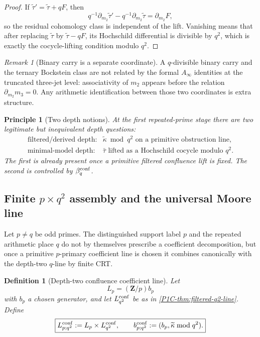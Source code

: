 \documentclass[11pt]{article}
\newtheorem{definition}[theorem]{Definition}
\newtheorem{principle}[theorem]{Principle}
\theoremstyle{remark}
\newtheorem{remark}[theorem]{Remark}
\newcommand{\Z}{\mathbf Z}
\begin{document}
\begin{proof}
If $\widetilde\tau'=\widetilde\tau+qF$, then
\[
 q^{-1}\partial_{m_2}\widetilde\tau'
 -q^{-1}\partial_{m_2}\widetilde\tau
 =\partial_{m_2}F,
\]
so the residual cohomology class is independent of the lift.  Vanishing means that after replacing $\widetilde\tau$ by $\widetilde\tau-qF$, its Hochschild differential is divisible by $q^2$, which is exactly the cocycle-lifting condition modulo $q^2$.
\end{proof}

\begin{remark}[Binary carry is a separate coordinate]
A $q$-divisible binary carry and the ternary Bockstein class are not related by the formal $A_\infty$ identities at the truncated three-jet level: associativity of $m_2$ appears before the relation $\partial_{m_2}m_3=0$.  Any arithmetic identification between those two coordinates is extra structure.
\end{remark}

\begin{principle}[Two depth notions]\label{P1C-prin:two-depth-notions}
At the first repeated-prime stage there are two legitimate but inequivalent depth questions:
\[
 \boxed{
 \begin{array}{ll}
 \text{filtered/derived depth:}
   & \widetilde\kappa\bmod q^2\text{ on a primitive obstruction line},\\[1mm]
 \text{minimal-model depth:}
   & \bar\tau\text{ lifted as a Hochschild cocycle modulo }q^2.
 \end{array}}
\]
The first is already present once a primitive filtered confluence lift is fixed.  The second is controlled by $\beta_q^{\rm conf}$.
\end{principle}

\subsection{Finite $p\times q^2$ assembly and the universal Moore line}

Let $p\ne q$ be odd primes.  The distinguished support label $p$ and the repeated arithmetic place $q$ do not by themselves prescribe a coefficient decomposition, but once a primitive $p$-primary coefficient line is chosen it combines canonically with the depth-two $q$-line by finite CRT.

\begin{definition}[Depth-two confluence coefficient line]\label{P1C-def:pq2-confluence-line}
Let
\[
 L_p=(\Z/p)b_p
\]
with $b_p$ a chosen generator, and let $L^{\rm conf}_{q^2}$ be as in
\cref{P1C-thm:filtered-q2-line}.  Define
\[
 \boxed{
 L^{\rm conf}_{p;q^2}
 :=
 L_p\times L^{\rm conf}_{q^2},
 \qquad
 b^{\rm conf}_{p;q^2}
 :=
 (b_p,\widetilde\kappa\bmod q^2).}
\]
\end{definition}
\end{document}
